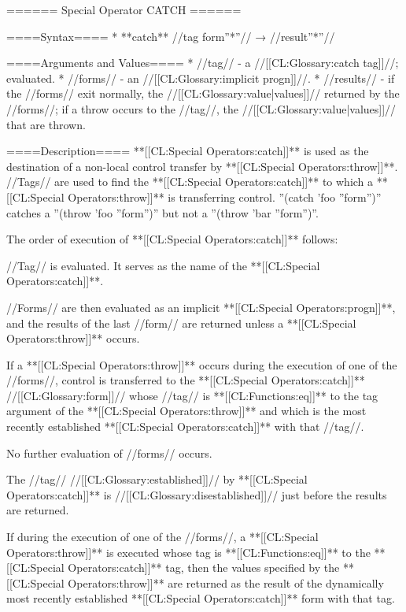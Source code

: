 ====== Special Operator CATCH ======

====Syntax====
* **catch** //tag form''*''// → //result''*''//

====Arguments and Values====
  * //tag// - a //[[CL:Glossary:catch tag]]//; evaluated.
  * //forms// - an //[[CL:Glossary:implicit progn]]//.
  * //results// - if the //forms// exit normally, the //[[CL:Glossary:value|values]]// returned by the //forms//; if a throw occurs to the //tag//, the //[[CL:Glossary:value|values]]// that are thrown.

====Description====
**[[CL:Special Operators:catch]]** is used as the destination of a non-local control transfer by **[[CL:Special Operators:throw]]**. //Tags// are used to find the **[[CL:Special Operators:catch]]** to which a **[[CL:Special Operators:throw]]** is transferring control. ''(catch 'foo ''form'')'' catches a ''(throw 'foo ''form'')'' but not a ''(throw 'bar ''form'')''.

The order of execution of **[[CL:Special Operators:catch]]** follows:

\beginlist {} //Tag// is evaluated. It serves as the name of the **[[CL:Special Operators:catch]]**.

 //Forms// are then evaluated as an implicit **[[CL:Special Operators:progn]]**, and the results of the last //form// are returned unless a **[[CL:Special Operators:throw]]** occurs.

 If a **[[CL:Special Operators:throw]]** occurs during the execution of one of the //forms//, control is transferred to the **[[CL:Special Operators:catch]]** //[[CL:Glossary:form]]// whose //tag// is **[[CL:Functions:eq]]** to the tag argument of the **[[CL:Special Operators:throw]]** and which is the most recently established **[[CL:Special Operators:catch]]** with that //tag//.

No further evaluation of //forms// occurs.

 The //tag// //[[CL:Glossary:established]]// by **[[CL:Special Operators:catch]]** is //[[CL:Glossary:disestablished]]// just before the results are returned.

\endlist

If during the execution of one of the //forms//, a **[[CL:Special Operators:throw]]** is executed whose tag is **[[CL:Functions:eq]]** to the **[[CL:Special Operators:catch]]** tag, then the values specified by the **[[CL:Special Operators:throw]]** are returned as the result of the dynamically most recently established **[[CL:Special Operators:catch]]** form with that tag.

